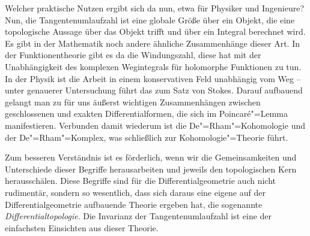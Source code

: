 Welcher praktische Nutzen ergibt sich da nun, etwa für Physiker und
Ingenieure?  Nun, die Tangentenumlaufzahl ist eine globale Größe
über ein Objekt, die eine topologische Aussage über das Objekt
trifft und über ein Integral berechnet wird. Es gibt in der Mathematik
noch andere ähnliche Zusammenhänge dieser Art. In der
Funktionentheorie gibt es da die Windungszahl, diese hat mit
der Unabhängigkeit des komplexen Wegintegrals für
holomorphe Funktionen zu tun.
In der Physik ist die Arbeit in einem konservativen
Feld unabhängig vom Weg -- unter genauerer Untersuchung führt das zum
Satz von Stokes. Darauf aufbauend gelangt man zu für uns äußerst
wichtigen Zusammenhängen zwischen geschlossenen und exakten
Differentialformen, die sich im Poincaré"=Lemma manifestieren.
Verbunden damit wiederum ist die De"=Rham"=Kohomologie und der
De"=Rham"=Komplex, was schließlich zur Kohomologie"=Theorie führt.

Zum besseren Verständnis ist es förderlich, wenn wir die
Gemeinsamkeiten und Unterschiede dieser Begriffe herausarbeiten
und jeweils den topologischen Kern herausschälen.
Diese Begriffe sind für die Differentialgeometrie auch nicht
rudimentär, sondern so wesentlich, dass sich daraus eine eigene
auf der Differentialgeometrie aufbauende Theorie ergeben hat,
die sogenannte \emph{Differentialtopologie}. Die Invarianz der
Tangentenumlaufzahl ist eine der einfachsten Einsichten aus
dieser Theorie.



